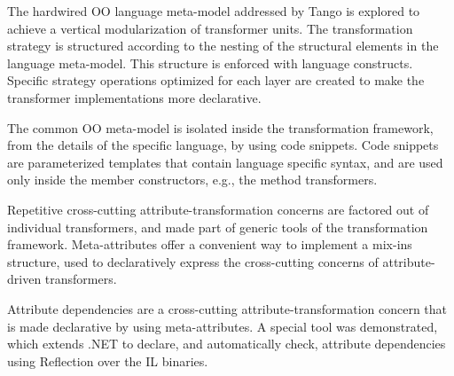The hardwired OO language meta-model addressed by Tango is explored to achieve a vertical modularization of transformer units. The transformation strategy is structured according to the nesting of the structural elements in the language meta-model. This structure is enforced with language constructs. Specific strategy operations optimized for each layer are created to make the transformer implementations more declarative.

The common OO meta-model is isolated inside the transformation framework, from the details of the specific language, by using code snippets. Code snippets are parameterized templates that contain language specific syntax, and are used only inside the member constructors, e.g., the method transformers.

Repetitive cross-cutting attribute-transformation concerns are factored out of individual transformers, and made part of generic tools of the transformation framework. Meta-attributes offer a convenient way to implement a mix-ins structure, used to declaratively express the cross-cutting concerns of attribute-driven transformers.

Attribute dependencies are a cross-cutting attribute-transformation concern that is made declarative by using meta-attributes. A special tool was demonstrated, which extends .NET to declare, and automatically check, attribute dependencies using Reflection over the IL binaries. 
